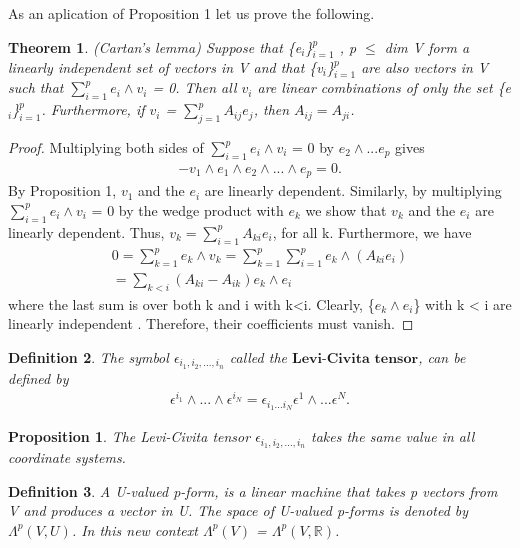 \documentclass[12pt,a4paper]{article}
\newtheorem{thm}{Theorem}
\newtheorem{defn}[thm]{Definition}
\newtheorem{prop}{Proposition}
\begin{document}
As an aplication of Proposition 1 let us prove the following.
\begin{thm}
(Cartan’s lemma) Suppose that \{e$_i$\}$^p_{i=1}$ , p $\leq$ dim V form
a linearly independent set of vectors in V and that  \{v$_i$\}$^p_{i=1}$ are also vectors
in V such that $\sum^{p}_{i=1} e_i \wedge v_i$ = 0. Then all $v_i$ are linear combinations of only
the set \{e$_i$\}$^p_{i=1}$. Furthermore, if $v_i$ = $\sum^p_{j=1} A_{ij}e_{j}$, then $A_{ij} = A_{ji}$.
\end{thm}
\begin{proof}
Multiplying both sides of $\sum^{p}_{i=1} e_i \wedge v_i$ = 0 by $e_2 \wedge ... e_p$ gives
\begin{eqnarray*}
-v_1 \wedge e_1 \wedge e_2 \wedge ... \wedge e_p = 0.
\end{eqnarray*}
By Proposition 1, $v_1$ and the $e_i$ are linearly dependent. Similarly, by
multiplying $\sum^{p}_{i=1} e_i \wedge v_i$ = 0 by the wedge product with $e_k$  we
show that $v_k$ and  the $e_i$ are linearly dependent. Thus, $v_k = \sum^p_{i=1} A_{ki} e_i$, for all k. Furthermore, we have\\
\begin{eqnarray*}
 0 = \sum^{p}_{k=1} e_k \wedge v_k  = \sum^{p}_{k=1} \sum^{p}_{i=1} e_k \wedge ( A_{ki} e_i) \\= \sum_{k<i} (A_{ki} - A_{ik}) e_k \wedge e_i
\end{eqnarray*}
where the last sum is over both k and i with k<i. Clearly, \{$e_k \wedge e_i$\} with k <
i are linearly independent . Therefore, their coefficients must
vanish.
\end{proof}
\begin{defn}
The symbol $\epsilon_{i_1, i_2, ... , i_n}$ called the $\textbf{Levi-Civita tensor}$, can be defined by
\begin{eqnarray*}
\epsilon^{i_1} \wedge ... \wedge \epsilon^{i_N} = \epsilon_{i_1 ... i_N} \epsilon^1 \wedge ... \epsilon^N.
\end{eqnarray*}
\end{defn}
\begin{prop}
The Levi-Civita tensor $\epsilon_{i_1, i_2, ... , i_n}$ takes the same value in
all coordinate systems.
\end{prop}
\begin{defn}
A U-valued p-form, is a linear machine that takes p
vectors from V and produces a vector in U. The space of U-valued p-forms
is denoted by $\Lambda^{p}(V, U)$.  In this new context $\Lambda^{p}(V)$ =  $\Lambda^{p}(V, \mathbb{R})$.
\end{defn}
\end{document}
